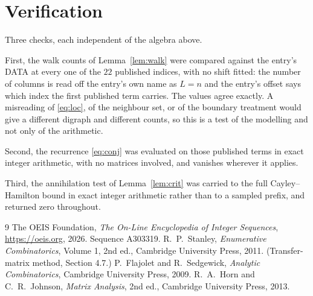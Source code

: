 \documentclass[11pt,a4paper]{article}
\theoremstyle{plain}
\theoremstyle{definition}
\begin{document}
\section{Verification}

Three checks, each independent of the algebra above.

First, the walk counts of Lemma~\ref{lem:walk} were compared against the entry's DATA at
every one of the $22$ published indices, with no shift fitted: the number of columns is
read off the entry's own name as $L=n$ and the entry's offset says which index the first
published term carries. The values agree exactly. A misreading of \eqref{eq:loc}, of the
neighbour set, or of the boundary treatment would give a different digraph and different
counts, so this is a test of the modelling and not only of the arithmetic.

Second, the recurrence \eqref{eq:conj} was evaluated on those published terms in exact
integer arithmetic, with no matrices involved, and vanishes wherever it applies.

Third, the annihilation test of Lemma~\ref{lem:crit} was carried to the full
Cayley--Hamilton bound in exact integer arithmetic rather than to a sampled prefix, and
returned zero throughout.

\begin{thebibliography}{9}
 The OEIS Foundation, \emph{The On-Line Encyclopedia of Integer
Sequences}, \url{https://oeis.org}, 2026. Sequence A303319.
 R.~P.~Stanley, \emph{Enumerative Combinatorics}, Volume 1, 2nd ed.,
Cambridge University Press, 2011. (Transfer-matrix method, Section 4.7.)
 P.~Flajolet and R.~Sedgewick, \emph{Analytic Combinatorics}, Cambridge
University Press, 2009.
 R.~A.~Horn and C.~R.~Johnson, \emph{Matrix Analysis}, 2nd ed., Cambridge
University Press, 2013.
\end{thebibliography}
\end{document}
